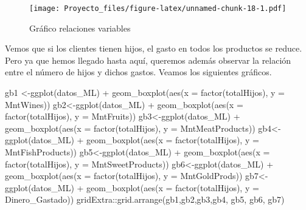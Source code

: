 \documentclass[
]{article}
\newenvironment{Shaded}{\begin{snugshade}}{\end{snugshade}}
\newcommand{\AttributeTok}[1]{\textcolor[rgb]{0.77,0.63,0.00}{#1}}
\newcommand{\FunctionTok}[1]{\textcolor[rgb]{0.00,0.00,0.00}{#1}}
\newcommand{\NormalTok}[1]{#1}
\newcommand{\OtherTok}[1]{\textcolor[rgb]{0.56,0.35,0.01}{#1}}
\newcommand{\SpecialCharTok}[1]{\textcolor[rgb]{0.00,0.00,0.00}{#1}}
\begin{document}
\begin{figure}
\centering
\texttt{[image: Proyecto\_files/figure-latex/unnamed-chunk-18-1.pdf]}
\caption{Gráfico relaciones variables}
\end{figure}

Vemos que si los clientes tienen hijos, el gasto en todos los productos
se reduce. Pero ya que hemos llegado hasta aquí, queremos además
observar la relación entre el número de hijos y dichos gastos. Veamos
los siguientes gráficos.

\begin{Shaded}
\begin{Highlighting}[]
\NormalTok{gb1 }\OtherTok{\textless{}{-}}\FunctionTok{ggplot}\NormalTok{(datos\_ML) }\SpecialCharTok{+} 
  \FunctionTok{geom\_boxplot}\NormalTok{(}\FunctionTok{aes}\NormalTok{(}\AttributeTok{x =} \FunctionTok{factor}\NormalTok{(totalHijos), }\AttributeTok{y =}\NormalTok{ MntWines))}
\NormalTok{gb2}\OtherTok{\textless{}{-}}\FunctionTok{ggplot}\NormalTok{(datos\_ML) }\SpecialCharTok{+} 
  \FunctionTok{geom\_boxplot}\NormalTok{(}\FunctionTok{aes}\NormalTok{(}\AttributeTok{x =} \FunctionTok{factor}\NormalTok{(totalHijos), }\AttributeTok{y =}\NormalTok{ MntFruits))}
\NormalTok{gb3}\OtherTok{\textless{}{-}}\FunctionTok{ggplot}\NormalTok{(datos\_ML) }\SpecialCharTok{+} 
  \FunctionTok{geom\_boxplot}\NormalTok{(}\FunctionTok{aes}\NormalTok{(}\AttributeTok{x =} \FunctionTok{factor}\NormalTok{(totalHijos), }\AttributeTok{y =}\NormalTok{ MntMeatProducts))}
\NormalTok{gb4}\OtherTok{\textless{}{-}}\FunctionTok{ggplot}\NormalTok{(datos\_ML) }\SpecialCharTok{+} 
  \FunctionTok{geom\_boxplot}\NormalTok{(}\FunctionTok{aes}\NormalTok{(}\AttributeTok{x =} \FunctionTok{factor}\NormalTok{(totalHijos), }\AttributeTok{y =}\NormalTok{ MntFishProducts))}
\NormalTok{gb5}\OtherTok{\textless{}{-}}\FunctionTok{ggplot}\NormalTok{(datos\_ML) }\SpecialCharTok{+} 
  \FunctionTok{geom\_boxplot}\NormalTok{(}\FunctionTok{aes}\NormalTok{(}\AttributeTok{x =} \FunctionTok{factor}\NormalTok{(totalHijos), }\AttributeTok{y =}\NormalTok{ MntSweetProducts))}
\NormalTok{gb6}\OtherTok{\textless{}{-}}\FunctionTok{ggplot}\NormalTok{(datos\_ML) }\SpecialCharTok{+} 
  \FunctionTok{geom\_boxplot}\NormalTok{(}\FunctionTok{aes}\NormalTok{(}\AttributeTok{x =} \FunctionTok{factor}\NormalTok{(totalHijos), }\AttributeTok{y =}\NormalTok{ MntGoldProds))}
\NormalTok{gb7}\OtherTok{\textless{}{-}}\FunctionTok{ggplot}\NormalTok{(datos\_ML) }\SpecialCharTok{+} 
  \FunctionTok{geom\_boxplot}\NormalTok{(}\FunctionTok{aes}\NormalTok{(}\AttributeTok{x =} \FunctionTok{factor}\NormalTok{(totalHijos), }\AttributeTok{y =}\NormalTok{ Dinero\_Gastado))}
\NormalTok{gridExtra}\SpecialCharTok{::}\FunctionTok{grid.arrange}\NormalTok{(gb1,gb2,gb3,gb4, gb5, gb6, gb7)}
\end{Highlighting}
\end{Shaded}
\end{document}
